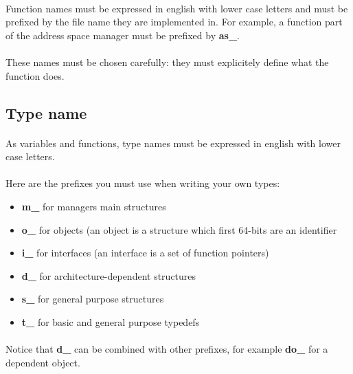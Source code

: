 \paragraph{}
Function names  must be expressed  in english with lower  case letters
and must  be prefixed by  the file name  they are implemented  in. For
example, a function part of the address space manager must be prefixed
by \textbf{as\_}.

\paragraph{}
These  names must be  chosen carefully:  they must  explicitely define
what the function does.

\subsection*{Type name}

\paragraph{}
As variables  and functions, type  names must be expressed  in english
with lower case letters.

\paragraph{}
Here are the prefixes you must use when writing your own types:

\begin{itemize}
\item \textbf{m\_} for managers main structures
\item \textbf{o\_} for  objects (an object is a  structure which first
64-bits are an identifier
\item \textbf{i\_} for interfaces (an interface is a set of function pointers)
\item \textbf{d\_} for architecture-dependent structures
\item \textbf{s\_} for general purpose structures
\item \textbf{t\_} for basic and general purpose typedefs
\end{itemize}

\paragraph{}
Notice  that \textbf{d\_}  can be  combined with  other  prefixes, for
example \textbf{do\_} for a dependent object.

